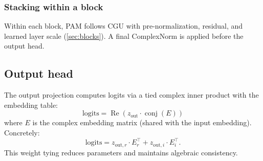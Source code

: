 \documentclass[11pt]{article}
\newcommand{\Repart}{\operatorname{Re}}
\begin{document}
\subsubsection{Stacking within a block}
Within each block, PAM follows CGU with pre-normalization, residual, and learned layer scale (\cref{sec:blocks}). A final ComplexNorm is applied before the output head.

\subsection{Output head}
The output projection computes logits via a tied complex inner product with the embedding table:
\begin{equation}
  \text{logits} = \Repart(z_{\text{out}} \cdot \operatorname{conj}(E))
\end{equation}
where $E$ is the complex embedding matrix (shared with the input embedding). Concretely:
\begin{equation}
  \text{logits} = z_{\text{out},r} \cdot E_r^\top + z_{\text{out},i} \cdot E_i^\top .
\end{equation}
This weight tying reduces parameters and maintains algebraic consistency.
\end{document}
